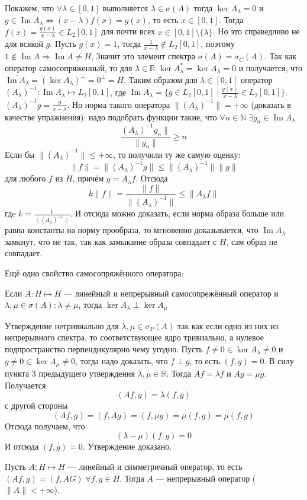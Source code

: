 \documentclass[12pt]{article}
\renewcommand{\Im}{\operatorname{Im}}
\newcommand{\Al}{A_\lambda}
\newcommand{\Alo}{(\Al)^{-1}}
\begin{document}
\begin{Prim}
    Покажем, что $\forall \lambda \in [0,1]$ выполняется $\lambda \in 
    \sigma(A)$ тогда $\ker \Al = 0$ и $g \in \Im \Al 
    \Leftrightarrow (x - \lambda)f(x) = g(x)$, то есть $x \in [0,1]$.
    Тогда $f(x) = \frac{g(x)}{x - \lambda} \in L_2[0,1]$ для почти всех $x \in 
    [0, 1] \setminus \{\lambda\}$.
    Но это справедливо не для всякой $g$.
    Пусть $g(x) = 1$, тогда $\frac{1}{x - \lambda} \notin L_2[0,1]$, поэтому 
    $1 \notin \Im A \Rightarrow \Im A \ne H$, 
    Значит это элемент спектра $\sigma(A) = \sigma_C(A)$.
    Так как оператор самосопряженный, то для $\lambda \in \mathbb R$ $\ker 
    \Al^* = \ker \Al = 0$ и получается, что
    $\overline{\Im \Al} = (\ker \Al)^\perp = 0^\perp = H$. 
    Таким образом для $\lambda \in [0,1]$ оператор $\Alo : \Im \Al \mapsto 
    L_2[0,1]$, где $\Im \Al = \{g \in L_2[0,1] \mid
    \frac{g(x)}{x - \lambda} \in L_2[0,1]\}$. 
    $\Alo g = \frac{g}{x - \lambda}$.
    Но норма такого оператора $\|\Alo\| = +\infty$ (доказать в качестве 
    упражнения): надо подобрать функции такие, что
    $\forall n \in \mathbb N\; \exists g_n \in \Im \Al$
    $$
    \frac{\Alo g_n\|}{\|g_n\|} \ge n
    $$
    Если бы $\|\Alo\| \le +\infty$, то получили ту же самую оценку:
    $$
    \|f\| = \|\Alo g\| \le \|\Alo\| \|g\|
    $$
    для любого $f$ из $H$, причём $g = \Al f$.
    Отсюда
    $$
    k\|f\| = \frac{\|f\|}{\|\Alo\|} \le \|\Al f\|
    $$
    гдe $k = \frac{1}{\|\Alo\|}$.
    И отсюда можно доказать, если норма образа больше или равна константы на 
    норму прообраза, то мгновенно
    доказывается, что $\Im \Al$ замкнут, что не так, так как замыкание образа 
    совпадает с $H$, сам образ не совпадает.
\end{Prim}

Ещё одно свойство самосопряжённого оператора:
\begin{Utv}
    Если $A : H \mapsto H$ --- линейный и непрерывный самосопрежённый оператор 
    и $\lambda, \mu \in \sigma(A)\colon
    \lambda \ne \mu$, тогда $\ker \Al \perp \ker A_\mu$
\end{Utv}
\begin{Proof}
    Утверждение нетривиально для $\lambda, \mu \in \sigma_P(A)$ так как если 
    одно из них из непрерывного спектра, то
    соответствующее ядро тривиально, а нулевое подпространство перпендикулярно 
    чему угодно.
    Пусть $f \ne 0 \in \ker \Al \ne 0$ и $g \ne 0 \in \ker A_\mu \ne 0$, тогда 
    надо доказать, что $f \perp g$, то есть $(f, g) = 0$.
    В силу пункта 3 предыдущего утверждения $\lambda, \mu \in \mathbb R$.
    Тогда $A f = \lambda f$ и $A g = \mu g$.
    Получается
    $$
    (Af, g) = \lambda (f, g)
    $$
    с другой стороны
    $$
    (Af, g) = (f, Ag) = (f, \mu g) = \overline{\mu}(f, g) = \mu (f, g)
    $$
    Отсюда получаем, что
    $$
    (\lambda - \mu)(f, g) = 0
    $$
    И отсюда $(f, g) = 0$.
    Утверждение доказано.
\end{Proof}
\begin{Upr}
    Пусть $A : H \mapsto H$ --- линейный и симметричный оператор, то есть $(Af 
    ,g) = (f, AG)\; \forall f,g \in H$.
    Тогда $A$ --- непрерывный оператор ($\|A\| < +\infty$).
\end{Upr}
\end{document}
